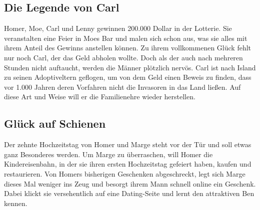 
\subsection{Die Legende von Carl}\label{RABF14}
Homer, Moe, Carl und Lenny gewinnen 200.000 Dollar in der Lotterie. Sie veranstalten eine Feier in Moes Bar und malen sich schon aus, was sie alles mit ihrem Anteil des Gewinns anstellen können. Zu ihrem vollkommenen Glück fehlt nur noch Carl, der das Geld abholen wollte. Doch als der auch nach mehreren Stunden nicht auftaucht, werden die Männer plötzlich nervös. Carl ist nach Island zu seinen Adoptiveltern geflogen, um von dem Geld einen Beweis zu finden, dass vor 1.000 Jahren deren Vorfahren nicht die Invasoren in das Land ließen. Auf diese Art und Weise will er die Familienehre wieder herstellen.


\subsection{Glück auf Schienen}
Der zehnte Hochzeitstag von Homer und Marge steht vor der Tür und soll etwas ganz Besonderes werden. Um Marge zu überraschen, will Homer die Kindereisenbahn, in der sie ihren ersten Hochzeitstag gefeiert haben, kaufen und restaurieren. Von Homers bisherigen Geschenken abgeschreckt, legt sich Marge dieses Mal weniger ins Zeug und besorgt ihrem Mann schnell online ein Geschenk. Dabei klickt sie versehentlich auf eine Dating-Seite und lernt den attraktiven Ben kennen.



